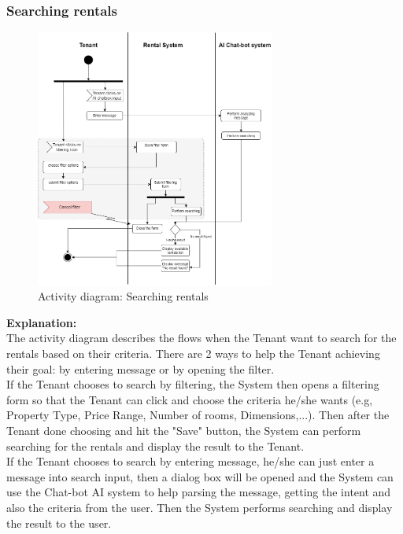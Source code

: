 \subsubsection{Searching rentals}
\begin{figure}[H]
    \centering
    \includegraphics[width=0.7\textwidth]{Images/Activity/ac_diag_search_rental.png}
    \caption{Activity diagram: Searching rentals}
    \label{fig:searching-rentals}
\end{figure}
\noindent \textbf{Explanation:}\\
The activity diagram describes the flows when the Tenant want to search for the rentals based on their criteria. There are 2 ways to help the Tenant achieving their goal: by entering message or by opening the filter.\\
If the Tenant chooses to search by filtering, the System then opens a filtering form so that the Tenant can click and choose the criteria he/she wants (e.g, Property Type, Price Range, Number of rooms, Dimensions,...). Then after the Tenant done choosing and hit the "Save" button, the System can perform searching for the rentals and display the result to the Tenant.\\
If the Tenant chooses to search by entering message, he/she can just enter a message into search input, then a dialog box will be opened and the System can use the Chat-bot AI system to help parsing the message, getting the intent and also the criteria from the user. Then the System performs searching and display the result to the user.


\newpage
